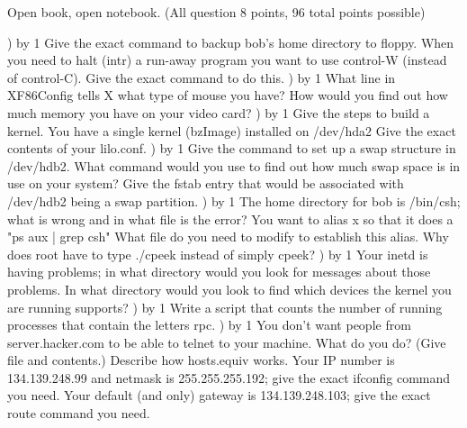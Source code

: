 
\parindent=0in
\nopagenumbers
\newcount\quesno
{}
\def\ques{\number\quesno) \advance\quesno by 1}
\def\aspace{\vskip 1.5in}

Open book, open notebook. (All question 8 points, 96 total points possible)

\ques
Give the exact command to backup bob's home directory
to floppy.
\vskip 0.5in
When you need to halt ({\ltt{}intr}) a run-away program
you want to use control-W (instead of control-C).
Give the exact command to do this.
\vskip 0.5in
\ques
What line in {\ltt{}XF86Config} tells X what
type of mouse you have?
\vskip 0.5in
How would you find out how much memory you have on your video card?
\vskip 1.5in
\ques
Give the steps to build a kernel.
\vskip 1.5in
You have a single kernel ({\ltt{}bzImage}) installed on {\ltt{}/dev/hda2}
Give the exact contents of your {\ltt{}lilo.conf}.
\vskip 1.8in
\vfill\eject
\ques
Give the command to set up a swap structure in {\ltt{}/dev/hdb2}.
\vskip 0.5in
What command would you use to find out how much swap space is in use
on your system?
\vskip 0.5in
Give the {\ltt{}fstab} entry that would be associated with
{\ltt{}/dev/hdb2} being a swap partition.
\vskip 0.5in
\ques
The home directory for {\ltt{}bob} is {\ltt{}/bin/csh};
what is wrong and in what file is the error?
\vskip 1.2in
You want to alias {\ltt{}x} so that it does a "{\ltt{}ps aux | grep csh}"
What file do you need to modify to establish this alias.
\vskip 0.5in
Why does {\ltt{}root} have to type {\ltt{}./cpeek} instead
of simply {\ltt{}cpeek}?
\vskip 0.5in
\ques
Your {\ltt{}inetd} is having problems;
in what directory would you look for messages about those problems.
\vskip 0.5in
In what directory would you look to find which devices the kernel you are
running supports?
\vskip 0.5in
\ques
Write a script that counts the number of running processes
that contain the letters {\ltt{}rpc}.
\vfill\eject
\ques
You don't want people from {\ltt{}server.hacker.com} to
be able to telnet to your machine. What do you do?
(Give file and contents.)
\vskip 0.9in
Describe how {\ltt{}hosts.equiv} works.
\vskip 1.1in
Your IP number is 134.139.248.99 and netmask is 255.255.255.192;
give the exact {\ltt{}ifconfig} command you need.
\vskip 0.5in
Your default (and only) gateway is 134.139.248.103;
give the exact {\ltt{}route} command you need.
\vskip 0.5in
